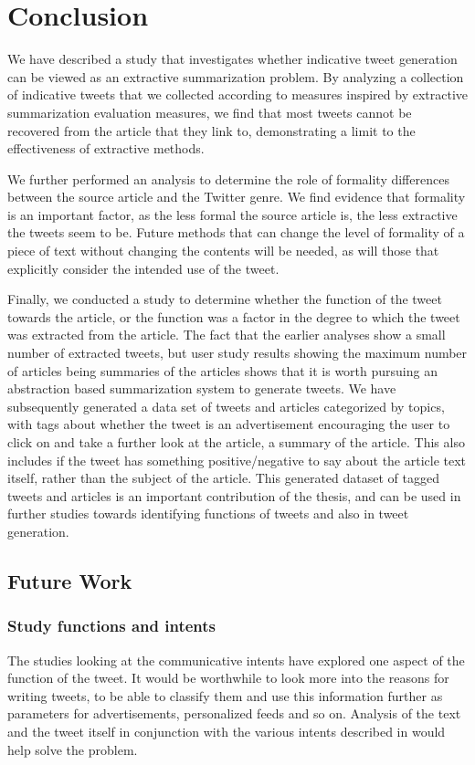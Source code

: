 \chapter{Conclusion}
We have described a study that investigates whether indicative tweet generation can be viewed as an extractive summarization problem. By analyzing a collection of indicative tweets that we collected according to measures inspired by extractive summarization evaluation measures, we find that most tweets cannot be recovered from the article that they link to, demonstrating a limit to the effectiveness of extractive methods.

We further performed an analysis to determine the role of formality differences between the source article and the Twitter genre. We find evidence that formality is an important factor, as the less formal the source article is, the less extractive the tweets seem to be. Future methods that can change the level of formality of a piece of text without changing the contents will be needed, as will those that explicitly consider the intended use of the tweet.

Finally, we conducted a study to determine whether the function of the tweet towards the article, or the function was a factor in the degree to which the tweet was extracted from the article. The fact that the earlier analyses show a small number of extracted tweets, but user study results showing the maximum number of articles being summaries of the articles shows that it is worth pursuing an abstraction based summarization system to generate tweets. We have subsequently generated a data set of tweets and articles categorized by topics, with tags about whether the tweet is an advertisement encouraging the user to click on and take a further look at the article, a summary of the article. This also includes if the tweet has something positive/negative to say about the article text itself, rather than the subject of the article. This generated dataset of tagged tweets and articles is an important contribution of the thesis, and can be used in further studies towards identifying functions of tweets and also in tweet generation.

\section{Future Work}

\subsection{Study functions and intents}
The studies looking at the communicative intents have explored one aspect of the function of the tweet. It would be worthwhile to look more into the reasons for writing tweets, to be able to classify them and use this information further as parameters for advertisements, personalized feeds and so on. Analysis of the text and the tweet itself in conjunction with the various intents described in \cite{sinclair1996preliminary} would help solve the problem.

